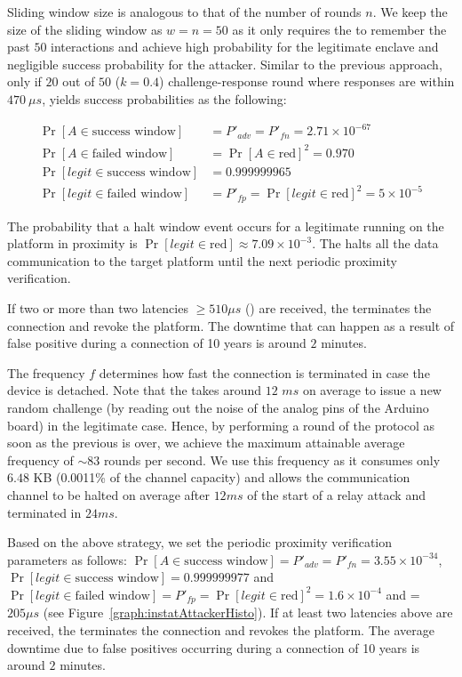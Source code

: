  Sliding window size is analogous to that of the number of rounds $n$. We keep  the size of the sliding window as $w=n=50$ as it only requires the \device to remember the past $50$ interactions and achieve high probability for the legitimate enclave and negligible success probability for the attacker. Similar to the previous approach, only if $20$ out of $50$ ($k=0.4$) challenge-response round where responses are within $470\ \mu s$, \name yields success probabilities as the following:

\begin{align*}
 \Pr[A \in \text{success window}]&=P'_{adv} = P'_{fn}= 2.71\times 10^{-67}\\
 \Pr[A \in \text{failed window}]&=\Pr[A\in\text{red}]^2=0.970\\
 \Pr[legit \in \text{success window}]&=0.999999965\\
 \Pr[legit \in \text{failed window}]&=P'_{fp}=\Pr[legit\in\text{red}]^2=5\times10^{-5}
\end{align*}

The probability that a halt window event occurs for a legitimate \app running on the platform in proximity is $\Pr[legit\in\text{red}]\approx 7.09\times10^{-3}$. The \device halts all the data communication to the target platform until the next periodic proximity verification.

If two or more than two latencies $\geq 510\mu s$ (\detach) are received, the \device terminates the connection and revoke the platform. The downtime that can happen as a result of false positive during a connection of 10 years is around $2$ minutes.

 The frequency $f$ determines how fast the connection is terminated in case the \device device is detached. Note that the \device takes around $12$ $ms$ on average to issue a new random challenge (by reading out the noise of the analog pins of the Arduino board) in the legitimate case. Hence, by performing a round of the protocol as soon as the previous is over, we achieve the maximum attainable average frequency of $\sim83$ rounds per second. We use this frequency as it consumes only $6.48$ KB (0.0011\% of the 
channel capacity) and allows the communication channel to be halted on average after $12 ms$ of the start of a relay attack and terminated in $24 ms$.

Based on the above strategy, we set the periodic proximity verification parameters as follows: $\Pr[A \in \text{success window}]=P'_{adv} = P'_{fn}= 3.55\times 10^{-34}$, $\Pr[legit \in \text{success window}]=0.999999977$ and $\Pr[legit \in \text{failed window}]=P'_{fp}=\Pr[legit\in\text{red}]^2=1.6\times10^{-4}$ and \detach = $205 \mu s$ (see Figure~\ref{graph:instatAttackerHisto}). If at least two latencies above \detach are received, the \device terminates the connection and revokes the platform. The average downtime due to false positives occurring during a connection of 10 years is around $2$ minutes. 




